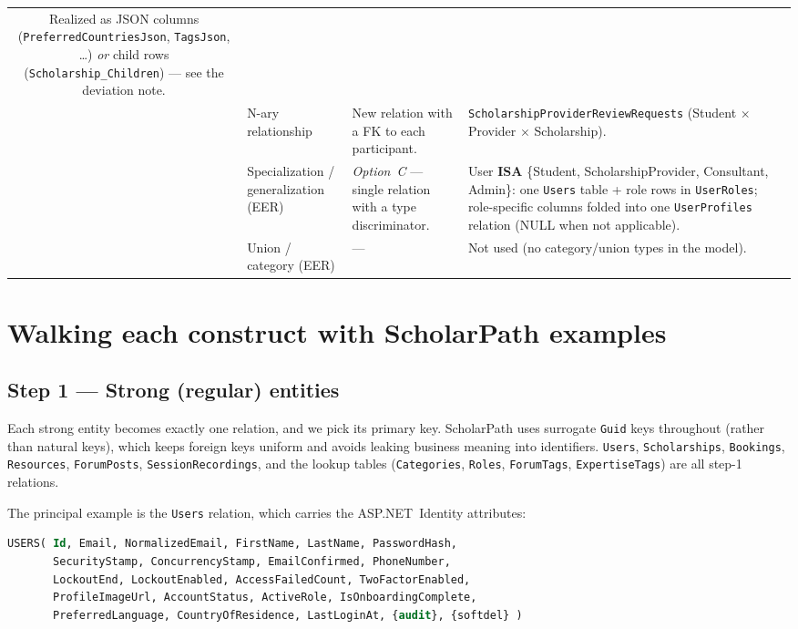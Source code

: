 \documentclass[11pt,a4paper]{article}
\begin{document}
\begin{table}[H]
\begin{longtable}{@{}c>{\raggedright\arraybackslash}p{2.7cm}>{\raggedright\arraybackslash}p{4.6cm}>{\raggedright\arraybackslash}p{5.2cm}@{}}
Realized as JSON columns (\texttt{PreferredCountriesJson}, \texttt{TagsJson},
\dots) \emph{or} child rows (\texttt{Scholarship\_Children}) --- see the
deviation note. \\
\addlinespace
7 & N-ary relationship & New relation with a FK to each participant. &
\texttt{ScholarshipProviderReviewRequests} (Student $\times$ Provider $\times$
Scholarship). \\
\addlinespace
8 & Specialization / generalization (EER) & \emph{Option~C} --- single relation
with a type discriminator. &
User \textbf{ISA} \{Student, ScholarshipProvider, Consultant, Admin\}: one
\texttt{Users} table + role rows in \texttt{UserRoles}; role-specific columns
folded into one \texttt{UserProfiles} relation (NULL when not applicable). \\
\addlinespace
9 & Union / category (EER) & --- &
Not used (no category/union types in the model). \\
\bottomrule
\end{longtable}
\end{table}

\section{Walking each construct with ScholarPath examples}

\subsection{Step 1 --- Strong (regular) entities}

Each strong entity becomes exactly one relation, and we pick its primary key.
ScholarPath uses surrogate \texttt{Guid} keys throughout (rather than natural
keys), which keeps foreign keys uniform and avoids leaking business meaning into
identifiers. \texttt{Users}, \texttt{Scholarships}, \texttt{Bookings},
\texttt{Resources}, \texttt{ForumPosts}, \texttt{SessionRecordings}, and the
lookup tables (\texttt{Categories}, \texttt{Roles}, \texttt{ForumTags},
\texttt{ExpertiseTags}) are all step-1 relations.

The principal example is the \texttt{Users} relation, which carries the
ASP.NET~Identity attributes:

\begin{lstlisting}[language=SQL]
USERS( Id, Email, NormalizedEmail, FirstName, LastName, PasswordHash,
       SecurityStamp, ConcurrencyStamp, EmailConfirmed, PhoneNumber,
       LockoutEnd, LockoutEnabled, AccessFailedCount, TwoFactorEnabled,
       ProfileImageUrl, AccountStatus, ActiveRole, IsOnboardingComplete,
       PreferredLanguage, CountryOfResidence, LastLoginAt, {audit}, {softdel} )
\end{lstlisting}
\end{document}
